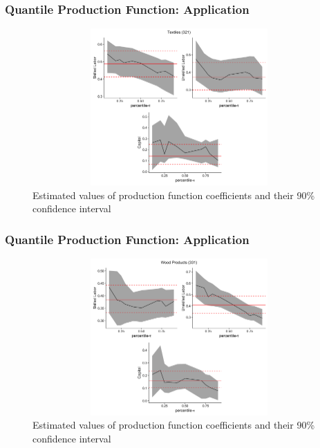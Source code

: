 \documentclass{beamer}
\begin{document}
\begin{frame}
\frametitle{Quantile Production Function: Application}
\begin{figure}[H]
\centering
\caption{Estimated values of production function coefficients and their 90\% confidence interval}
\includegraphics[width=12cm, height=6cm, keepaspectratio]{Coefficient_Plot_3.png}
\end{figure}
\end{frame}


\begin{frame}
\frametitle{Quantile Production Function: Application}
\begin{figure}[H]
\centering
\caption{Estimated values of production function coefficients and their 90\% confidence interval}
\includegraphics[width=12cm, height=6cm, keepaspectratio]{Coefficient_Plot_4.png}
\end{figure}
\end{frame}

\end{document}
